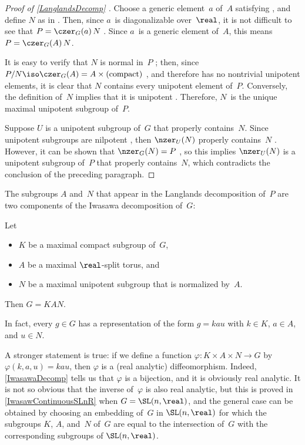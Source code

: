  \begin{proof}[Proof of \cref{LanglandsDecomp} \optional]
 Choose a generic element~$a$ of~$A$ satisfying , and define $N$ as in . Then, since $a$~is diagonalizable over~$\real$, it is not difficult to see that $P = \czer_G(a)\, N$ .
Since $a$~is a generic element of~$A$, this means $P = \czer_G(A)\, N$.

It is easy to verify that $N$ is normal in~$P$ ; then, since $P/N \iso \czer_G(A) = A \times (\text{compact})$ , and therefore has no nontrivial unipotent elements, it is clear that $N$ contains every unipotent element of~$P$. 
Conversely, the definition of~$N$ implies that it is unipotent .
Therefore, $N$~is the unique maximal unipotent subgroup of~$P$.

Suppose $U$ is a unipotent subgroup of~$G$ that properly contains~$N$.
Since unipotent subgroups are nilpotent , then $\nzer_U(N)$ properly contains~$N$ .
However, it can be shown that $\nzer_G(N) = P$ , so this implies $\nzer_U(N)$ is a unipotent subgroup of~$P$ that properly contains~$N$, 
which contradicts the conclusion of the preceding paragraph. %
 \end{proof}

The subgroups $A$ and~$N$ that appear in the Langlands decomposition of~$P$ are two components of the Iwasawa decomposition of~$G$:

\begin{thm} \label{IwasawaDecomp}
 Let 
 \noprelistbreak
 \begin{itemize}
 \item $K$ be a maximal compact subgroup of~$G$,
 \item $A$ be a maximal $\real$-split torus, 
 and
 \item $N$ be a maximal unipotent subgroup that is normalized by~$A$.
 \end{itemize}
Then $G = K A N$.

 In fact, every $g \in G$ has a  representation of the form $g = k a u$ with $k \in K$, $a \in A$, and $u \in N$. 
 \end{thm}

\begin{rem} \label{IwasawaDiffeo}
 A stronger statement is true: if we define a function $\varphi \colon K \times A \times N \to G$ by\/
 $\varphi(k,a,u) = kau$, then $\varphi$ is a (real analytic) diffeomorphism. Indeed, \cref{IwasawaDecomp} tells us that $\varphi$ is a bijection, and it is obviously real analytic. It is not so obvious that the inverse of~$\varphi$ is also real analytic, but this is proved in \cref{IwasawContinuousSLnR} when $G = \SL(n,\real)$, and the general case can be obtained by choosing an embedding of~$G$ in $\SL(n,\real)$ for which the subgroups $K$, $A$, and~$N$ of~$G$ are equal to the intersection of~$G$ with the corresponding subgroups of $\SL(n,\real)$.
 \end{rem}


